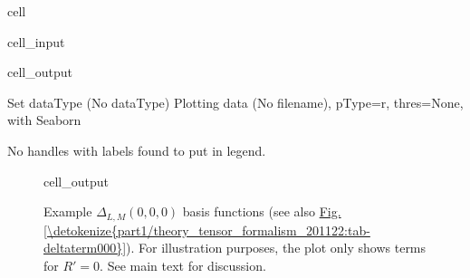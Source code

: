 \documentclass[letterpaper,table,10pt,english]{jupyterBook}
\begin{document}
\begin{sphinxuseclass}{cell}
\begin{sphinxVerbatimInput}
\begin{sphinxuseclass}{cell_input}
\begin{sphinxVerbatim}[commandchars=\\\{\}]
  
   
\end{sphinxVerbatim}

\end{sphinxuseclass}\end{sphinxVerbatimInput}
\begin{sphinxVerbatimOutput}

\begin{sphinxuseclass}{cell_output}
\begin{sphinxVerbatim}[commandchars=\\\{\}]
Set dataType (No dataType)
Plotting data (No filename), pType=r, thres=None, with Seaborn
\end{sphinxVerbatim}

\begin{sphinxVerbatim}[commandchars=\\\{\}]
No handles with labels found to put in legend.
\end{sphinxVerbatim}

\noindent{}

\end{sphinxuseclass}\end{sphinxVerbatimOutput}

\end{sphinxuseclass}
\begin{figure}[htbp]
\centering
\capstart
\begin{sphinxVerbatimOutput}

\begin{sphinxuseclass}{cell_output}
\noindent{}

\end{sphinxuseclass}\end{sphinxVerbatimOutput}
\caption{Example \(\Delta_{L,M}(0,0,0)\) basis functions (see also \hyperref[\detokenize{part1/theory_tensor_formalism_201122:tab-deltaterm000}]{Fig.\@ \ref{\detokenize{part1/theory_tensor_formalism_201122:tab-deltaterm000}}}). For illustration purposes, the plot only shows terms for \(R'=0\). See main text for discussion.}\label{\detokenize{part1/theory_tensor_formalism_201122:fig-deltaterm000}}\end{figure}
\end{document}
